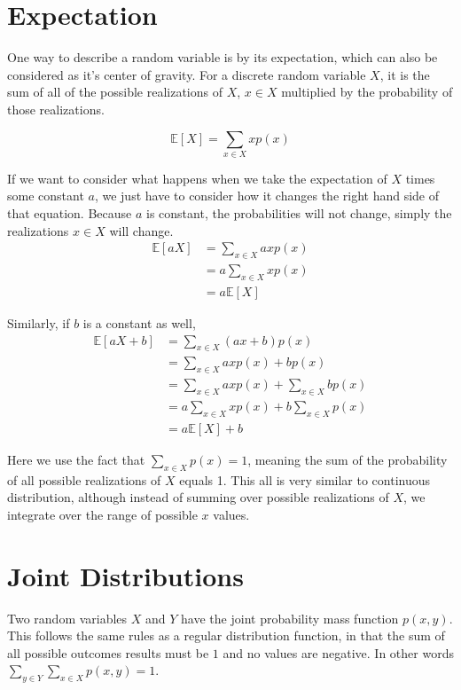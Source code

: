 \documentclass{article} %
\newcommand*\red{\color{red}}  %
\newcommand{\E}{\mathbb{E}}    %
\begin{document}
\section{Expectation}

One way to describe a random variable is by its expectation, which can also be considered as it's center of gravity. For a discrete random variable $X$, it is the sum of all of the possible realizations of $X$, $x \in X$ multiplied by the probability of those realizations.

\[
\E[X] = \sum_{x \in X} x p(x)
\]

If we want to consider what happens when we take the expectation of $X$ times some constant $a$, we just have to consider how it changes the right hand side of that equation. Because $a$ is constant, the probabilities will not change, simply the realizations $x\in X$ will change.
\begin{align*}
	\E[aX] &= \sum_{x \in X} ax p(x) \\
	&= a \sum_{x \in X} x p(x) \\
	&= a \E[X]
\end{align*}

Similarly, if $b$ is a constant as well,
\begin{align*}
	\E[aX + b] &= \sum_{x \in X} (ax + b) p(x) \\
	&= \sum_{x \in X} ax p(x) + b p(x) \\
	&= \sum_{x \in X} ax p(x) + \sum_{x \in X} b p(x) \\
	&= a \sum_{x \in X} x p(x) + b \sum_{x \in X} p(x) \\
	&= a \E[X] + b
\end{align*}

Here we use the fact that $\sum_{x \in X} p(x) = 1$, meaning the sum of the probability of all possible realizations of $X$ equals 1. This all is very similar to continuous distribution, although instead of summing over possible realizations of $X$, we integrate over the range of possible $x$ values.

\section{Joint Distributions}

Two random variables $X$ and $Y$ have the {\red joint probability mass function} $p(x, y)$. This follows the same rules as a regular distribution function, in that the sum of all possible outcomes results must be $1$ and no values are negative. In other words $\sum_{y \in Y} \sum_{x \in X} p(x, y) = 1$.
\end{document}

